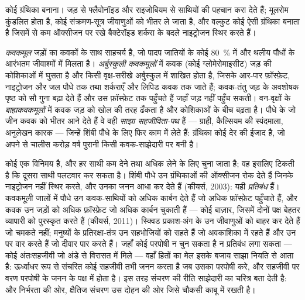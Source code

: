 \begin{omfigure}
{\small कोई ग्रंथिका बनाना। जड़ से फ्लैवोनॉइड और राइजोबियम से 
साथियों की पहचान करा देते हैं; मूलरोम कुंडलित होता है, कोई
संक्रमण-सूत्र जीवाणुओं को भीतर ले जाता है, और वल्कुट कोई ऐसी ग्रंथिका
बनाता है जिसमें  से कम ऑक्सीजन पर रखे बैक्टेरॉइड शर्करा
के बदले नाइट्रोजन स्थिर करते हैं।}
\end{omfigure}

\begin{definition}[कवकमूल]\label{def:b3:microbiomes:mycorrhiza}
\emph{कवकमूल} जड़ों का कवकों के साथ साहचर्य है, जो पादप जातियों के कोई
\qty{80}{\%} में और थलीय पौधों के आरंभतम जीवाश्मों में मिलता है।
\emph{अर्बुस्कुली कवकमूलों} में कवक (कोई ग्लोमेरोमाइसीट) जड़ की
कोशिकाओं में घुसता है और किसी वृक्ष-सरीखे अर्बुस्कुल में शाखित होता है,
जिसके आर-पार फ़ॉस्फ़ेट, नाइट्रोजन और जल पौधे तक तथा शर्कराएँ और लिपिड
कवक तक जाते हैं; कवक-तंतु जड़ के अवशोषक पृष्ठ को सौ गुना बढ़ा देते हैं
और उस फ़ॉस्फ़ेट तक पहुँचते हैं जहाँ जड़ नहीं पहुँच सकती। वन-वृक्षों के
\emph{बाह्यकवकमूलों} में कवक जड़ को खोल की तरह ढँकता है और कोशिकाओं के
बीच बढ़ता है। पौधे के जो जीन कवक को भीतर आने देते हैं वे वही
\emph{साझा सहजीविता-पथ} हैं --- ग्राही, कैल्सियम की स्पंदमाला, अनुलेखन
कारक --- जिन्हें शिंबी पौधे  के लिए फिर काम में लेते हैं:
ग्रंथिका कोई देर की ईजाद है, जो अपने से चालीस करोड़ वर्ष पुरानी किसी
कवक-साझेदारी पर बनी है।
\end{definition}

\begin{proposition}[व्यापार और उसकी चौकसी]\label{prop:b3:microbiomes:sanctions}
कोई  एक विनिमय है, और हर साथी कम देने तथा अधिक लेने के लिए
चुना जाता है; वह इसलिए टिकती है कि दूसरा साथी पलटवार कर सकता है। शिंबी
पौधे उन ग्रंथिकाओं की ऑक्सीजन रोक देते हैं जिनके  नाइट्रोजन
नहीं स्थिर करते, और उनका जनन आधा कर देते हैं (कीयर्स, 2003): यही
\emph{प्रतिबंध} हैं। कवकमूली जालों में पौधे उन कवक-साथियों को अधिक
कार्बन देते हैं जो अधिक फ़ॉस्फ़ेट पहुँचाते हैं, और कवक उन जड़ों को अधिक
फ़ॉस्फ़ेट जो अधिक कार्बन चुकाती हैं --- कोई बाज़ार, जिसमें दोनों पक्ष
बेहतर व्यापारी को पुरस्कृत करते हैं (कीयर्स, 2011)। स्क्विड
प्रकाश-अंग के उन जीवाणुओं को बाहर कर देते हैं जो चमकते नहीं; मनुष्यों
के प्रतिरक्षा-तंत्र उन सहभोजियों को सहते हैं जो अवकाशिका में रहते हैं
और उन पर वार करते हैं जो दीवार पार करते हैं। जहाँ कोई परपोषी न चुन
सकता है न प्रतिबंध लगा सकता --- कोई अंतःसहजीवी जो अंडे से विरासत में
मिले --- वहाँ हितों का मेल इसके बजाय साझा नियति से आता है: ऊर्ध्वाधर
रूप से संचरित कोई सहजीवी तभी जनन करता है जब उसका परपोषी करे, और सहजीवी
पर वरण परपोषी के जनन के पक्ष में होता है। इस तरह संचरण की रीति
साझेदारी का चरित्र बता देती है:   और निर्भरता
की ओर, क्षैतिज संचरण उस दोहन की ओर जिसे चौकसी काबू में रखती है।
\end{proposition}
\admitted

